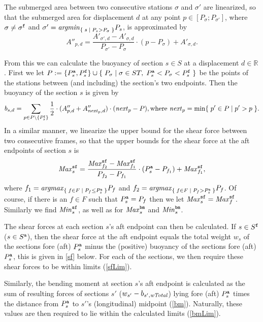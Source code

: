 The submerged area between two consecutive stations $\sigma$ and $\sigma'$ are linearized, so that the submerged area for displacement $d$ at any point $p\in[P_\sigma;P_{\sigma'}]$, where $\sigma\neq \sigma^{\texttt{f}}$ and $\sigma' = \mathit{argmin}_{\{\;{s}\;|\;{P_s > P_\sigma}\;\}}P_s$, is approximated by
\[
A''_{p,d} = \frac{A'_{\sigma',d}-A'_{\sigma,d}}{P_{\sigma'}-P_\sigma}\cdot(p-P_\sigma) + A'_{\sigma,d}.
\]

From this we can calculate the buoyancy of section $s \in S$ at a displacement $d\in \mathbb{R}$. First we let $P := \{P^{\texttt{a}}_s, P^{\texttt{f}}_s\} \cup \{\;{P_\sigma}\;|\;{\sigma\in ST,\; P^{\texttt{a}}_s < P_\sigma < P^{\texttt{f}}_s}\;\}$ be the points of the stations between (and including) the section's two endpoints. Then the buoyancy of the section $s$ is given by
\[
b_{s,d} = \sum_{p \in P\setminus \{P^{\texttt{f}}_s\}} \frac{1}{2}\cdot(A''_{p,d}+A''_{\mathit{next}_p,d})\cdot (\mathit{next}_p-P), \text{where } \mathit{next}_p = \min\{\;{p' \in P}\;|\;{p' > p}\;\}.
\]
In a similar manner, we linearize the upper bound for the shear force between two consecutive frames, so that the upper bounds for the shear force at the aft endpoints of section $s$ is
\[
\mathit{Max}^{\texttt{sf}}_s = \frac{\mathit{Max}^{\texttt{sf}}_{f_2}-\mathit{Max}^{\texttt{sf}}_{f_1}}{P_{f_2}-P_{f_1}}\cdot(P^{\texttt{a}}_s - P_{f_1}) + \mathit{Max}^{\texttt{sf}}_{f_1}, 
\]
where $f_1 = \mathit{argmax}_{\{\;{f\in F}\;|\;{P_f\leq P^{\texttt{a}}_s}\;\}}P_f$ and $f_2 = \mathit{argmax}_{\{\;{f\in F}\;|\;{P_f>P^{\texttt{a}}_s}\;\}}P_f$. Of course, if there is an $f\in F$ such that $P^{\texttt{a}}_s = P_f$ then we let $\mathit{Max}^{\texttt{sf}}_s = \mathit{Max}^{\texttt{sf}}_f$. Similarly we find $\mathit{Min}^{\texttt{sf}}_s$, as well as for $\mathit{Max}^{\texttt{bm}}_s$ and $\mathit{Min}^{\texttt{bm}}_s$.   

The shear forces at each section $s$'s aft endpoint can then be calculated. If $s\in S^{\texttt{f}}$ ($s\in S^{\texttt{a}}$), then the shear force at the aft endpoint equals the total weight $w_s$ of the sections fore (aft) $P^{\texttt{a}}_s$ minus the (positive) buoyancy of the sections fore (aft) $P^{\texttt{a}}_s$, this is given in \eqref{sf} below. For each of the sections, we then require these shear forces to be within limits (\ref{sfLim}).   

Similarly, the bending moment at section $s$'s aft endpoint is calculated as the sum of resulting forces of sections $s'$ ($w_{s'} - b_{s', \mathit{wTotal}}$) lying fore (aft) $P^{\texttt{a}}_s$ times the distance from $P^{\texttt{a}}_s$ to $s'$'s (longitudinal) midpoint (\ref{bm}). Naturally, these values are then required to lie within the calculated limits (\ref{bmLim}).

